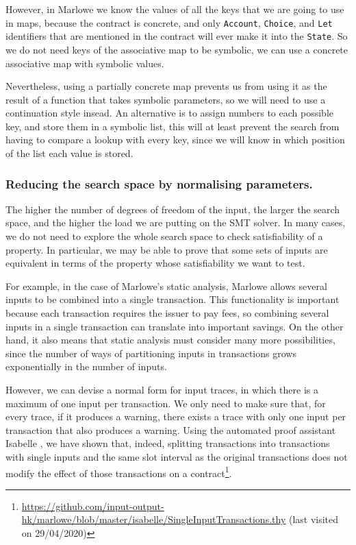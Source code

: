 \documentclass[english,runningheads]{llncs}
\begin{document}
However, in Marlowe we know the values of all the keys that we are
going to use in maps, because the contract is concrete, and only \texttt{Account},
\texttt{Choice}, and \texttt{Let} identifiers that are mentioned in
the contract will ever make it into the \texttt{State}. So we do not
need keys of the associative map to be symbolic, we can use a concrete
associative map with symbolic values.

Nevertheless, using a partially concrete map prevents us from using
it as the result of a function that takes symbolic parameters, so
we will need to use a continuation style insead. An alternative is
to assign numbers to each possible key, and store them in a symbolic
list, this will at least prevent the search from having to compare
a lookup with every key, since we will know in which position of the
list each value is stored. 

\subsubsection{Reducing the search space by normalising parameters.
\label{subsec:Reducing-search-space-by-normalising-parameters}}

The higher the number of degrees of freedom of the input, the larger
the search space, and the higher the load we are putting on the SMT
solver. In many cases, we do not need to explore the whole search
space to check satisfiability of a property. In particular, we may
be able to prove that some sets of inputs are equivalent in terms
of the property whose satisfiability we want to test.

For example, in the case of Marlowe's static analysis,
Marlowe allows several inputs to be combined into a single transaction.
This functionality is important because each transaction requires
the issuer to pay fees, so combining several inputs in a single transaction
can translate into important savings. On the other hand, it also means
that static analysis must consider many more possibilities, since
the number of ways of partitioning inputs in transactions grows exponentially
in the number of inputs.

However, we can devise a normal form for input traces, in which there
is a maximum of one input per transaction. We only need to make sure
that, for every trace, if it produces a warning, there exists a trace
with only one input per transaction that also produces a warning.
Using the automated proof assistant Isabelle \cite{nipkow2002isabelle},
we have shown that, indeed, splitting transactions into transactions
with single inputs and the same slot interval as the original transactions
does not modify the effect of those transactions on a contract\footnote{\url{https://github.com/input-output-hk/marlowe/blob/master/isabelle/SingleInputTransactions.thy}
(last visited on 29/04/2020)}.
\end{document}
